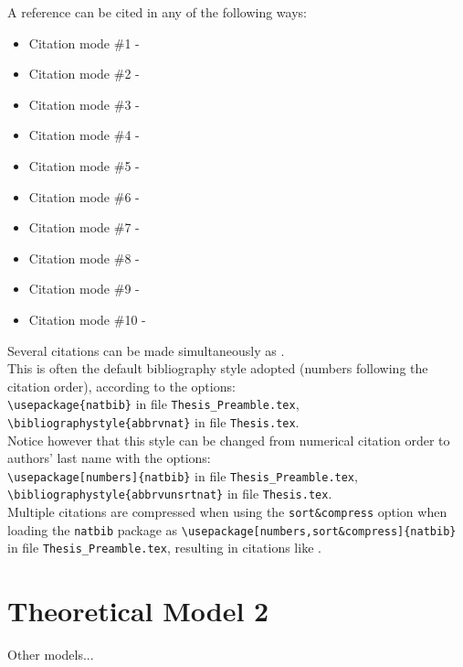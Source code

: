 A reference can be cited in any of the following ways:
%
\begin{itemize}
  \item Citation mode \#1 - \quad \cite{jameson:adjointns}
  \item Citation mode \#2 - \quad \citet{jameson:adjointns}
  \item Citation mode \#3 - \quad \citep{jameson:adjointns}
  \item Citation mode \#4 - \quad \citet*{jameson:adjointns}
  \item Citation mode \#5 - \quad \citep*{jameson:adjointns}
  \item Citation mode \#6 - \quad \citealt{jameson:adjointns}
  \item Citation mode \#7 - \quad \citealp{jameson:adjointns}
  \item Citation mode \#8 - \quad \citeauthor{jameson:adjointns}
  \item Citation mode \#9 - \quad \citeyear{jameson:adjointns}
  \item Citation mode \#10 - \quad \citeyearpar{jameson:adjointns}
\end{itemize}
%
Several citations can be made simultaneously as \citep{nocedal:opt,marta:ijcfd}. \\

This is often the default bibliography style adopted (numbers following the citation order), according to the options:\\
{\tt \textbackslash usepackage\{natbib\}} in file {\tt Thesis\_Preamble.tex},\\
{\tt \textbackslash bibliographystyle\{abbrvnat\}} in file {\tt Thesis.tex}.\\

Notice however that this style can be changed from numerical citation order to authors' last name with the options: \\
{\tt \textbackslash usepackage[numbers]\{natbib\}} in file {\tt Thesis\_Preamble.tex},\\
{\tt \textbackslash bibliographystyle\{abbrvunsrtnat\}} in file {\tt Thesis.tex}. \\

Multiple citations are compressed when using the {\tt sort\&compress} option when loading the {\tt natbib} package as {\tt \textbackslash usepackage[numbers,sort\&compress]\{natbib\}} in file {\tt Thesis\_Preamble.tex}, resulting in citations like \citep{marta:ijcfd1,marta:ijcfd2,marta:ijcfd3,marta:ijcfd4}.


\section{Theoretical Model 2}
\label{section:theory2}

Other models...

